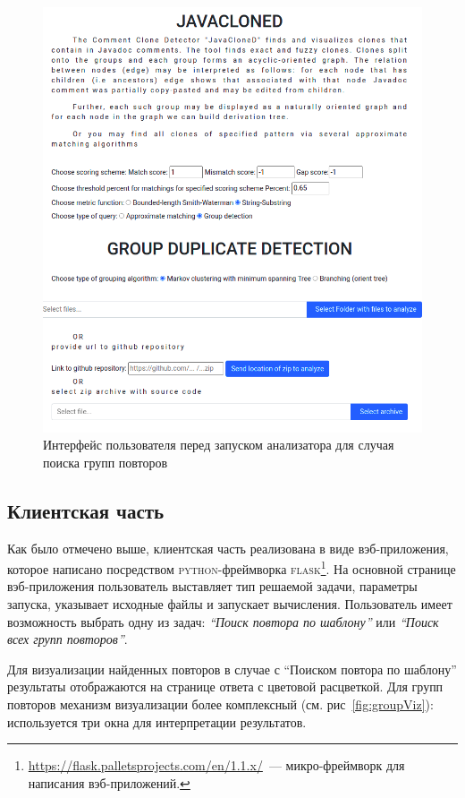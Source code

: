 \begin{figure}[h!]
    \centering
    \includegraphics[width=1.3\columnwidth,angle=90]{Mishin/figures/startApp.png}
    \caption{Интерфейс пользователя перед запуском анализатора для случая поиска групп повторов}\label{fig:startApp}
\end{figure}

\subsection{Клиентская часть}\label{clinet}
Как было отмечено выше, клиентская часть реализована в виде вэб-приложения, которое написано посредством \textsc{python}-фреймворка \textsc{flask}\footnote{\url{https://flask.palletsprojects.com/en/1.1.x/}~--- микро-фреймворк для написания вэб-приложений.}.
На основной странице вэб-приложения пользователь выставляет тип решаемой задачи, параметры запуска, указывает исходные файлы и запускает вычисления.
Пользователь имеет возможность выбрать одну из задач: \emph{``Поиск повтора по шаблону''} или \emph{``Поиск всех групп повторов''}.

Для визуализации найденных повторов в случае с  ``Поиском повтора по шаблону'' результаты отображаются на странице ответа с цветовой расцветкой.
Для групп повторов механизм визуализации более комплексный (см. рис~\ref{fig:groupViz}): используется три окна для интерпретации результатов.

